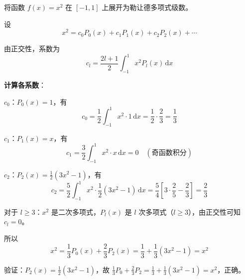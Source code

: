 \begin{lizi}{}{}
将函数 $f(x) = x^2$ 在 $[-1, 1]$ 上展开为勒让德多项式级数。

\begin{jie}
    设
    \begin{equation}
        x^2 = c_0 P_0(x) + c_1 P_1(x) + c_2 P_2(x) + \cdots
    \end{equation}
    
    由正交性，系数为
    \begin{equation}
        c_l = \frac{2l+1}{2}\int_{-1}^{1} x^2 P_l(x)\,\mathrm{d}x
    \end{equation}
    
    \textbf{计算各系数}：
    
    $c_0$：$P_0(x) = 1$，有
    \begin{equation}
        c_0 = \frac{1}{2}\int_{-1}^{1} x^2 \cdot 1\,\mathrm{d}x = \frac{1}{2} \cdot \frac{2}{3} = \frac{1}{3}
    \end{equation}
    
    $c_1$：$P_1(x) = x$，有
    \begin{equation}
        c_1 = \frac{3}{2}\int_{-1}^{1} x^2 \cdot x\,\mathrm{d}x = 0 \quad (\text{奇函数积分})
    \end{equation}
    
    $c_2$：$P_2(x) = \frac{1}{2}(3x^2 - 1)$，有
    \begin{equation}
        c_2 = \frac{5}{2}\int_{-1}^{1} x^2 \cdot \frac{1}{2}(3x^2 - 1)\,\mathrm{d}x = \frac{5}{4}\left[3 \cdot \frac{2}{5} - \frac{2}{3}\right] = \frac{2}{3}
    \end{equation}
    
    对于 $l \geq 3$：$x^2$ 是二次多项式，$P_l(x)$ 是 $l$ 次多项式（$l \geq 3$），由正交性可知 $c_l = 0$。
    
    所以
    \begin{equation}
        \boxed{x^2 = \frac{1}{3}P_0(x) + \frac{2}{3}P_2(x) = \frac{1}{3} + \frac{1}{3}(3x^2 - 1) = x^2}
    \end{equation}
    
    验证：$P_2(x) = \frac{1}{2}(3x^2-1)$，故 $\frac{1}{3}P_0 + \frac{2}{3}P_2 = \frac{1}{3} + \frac{1}{3}(3x^2-1) = x^2$，正确。
\end{jie}
\end{lizi}

